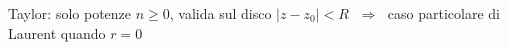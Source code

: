 \documentclass[preview]{standalone}
\begin{document}
\begin{center}
Taylor: solo potenze $n\ge 0$, valida sul disco $|z-z_0|<R$ $\;\Longrightarrow\;$ caso particolare di Laurent quando $r=0$
\end{center}
\end{document}
